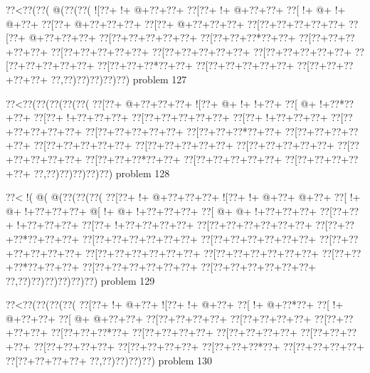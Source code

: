 \vbox{\vbox{\goo
\0??<\0??(\0??(\- @(\0??(\0??(
\- ![\0??+\- !+\- @+\0??+\0??+
\0??[\0??+\- !+\- @+\0??+\0??+
\0??[\- !+\- @+\- !+\- @+\0??+
\0??[\0??+\- @+\0??+\0??+\0??+
\0??[\0??+\- @+\0??+\0??+\0??+
\0??[\0??+\0??+\0??+\0??+\0??+
\0??[\0??+\- @+\0??+\0??+\0??+
\0??[\0??+\0??+\0??+\0??+\0??+
\0??[\0??+\0??+\0??*\0??+\0??+
\0??[\0??+\0??+\0??+\0??+\0??+
\0??[\0??+\0??+\0??+\0??+\0??+
\0??[\0??+\0??+\0??+\0??+\0??+
\0??[\0??+\0??+\0??+\0??+\0??+
\0??[\0??+\0??+\0??+\0??+\0??+
\0??[\0??+\0??+\0??*\0??+\0??+
\0??[\0??+\0??+\0??+\0??+\0??+
\0??[\0??+\0??+\0??+\0??+\0??+
\0??,\0??)\0??)\0??)\0??)\0??)
}
\hfil problem 127\hfil\break
}

\vbox{\vbox{\goo
\0??<\0??(\0??(\0??(\0??(\0??(
\0??[\0??+\- @+\0??+\0??+\0??+
\- ![\0??+\- @+\- !+\- !+\0??+
\0??[\- @+\- !+\0??*\0??+\0??+
\0??[\0??+\- !+\0??+\0??+\0??+
\0??[\0??+\0??+\0??+\0??+\0??+
\0??[\0??+\- !+\0??+\0??+\0??+
\0??[\0??+\0??+\0??+\0??+\0??+
\0??[\0??+\0??+\0??+\0??+\0??+
\0??[\0??+\0??+\0??*\0??+\0??+
\0??[\0??+\0??+\0??+\0??+\0??+
\0??[\0??+\0??+\0??+\0??+\0??+
\0??[\0??+\0??+\0??+\0??+\0??+
\0??[\0??+\0??+\0??+\0??+\0??+
\0??[\0??+\0??+\0??+\0??+\0??+
\0??[\0??+\0??+\0??*\0??+\0??+
\0??[\0??+\0??+\0??+\0??+\0??+
\0??[\0??+\0??+\0??+\0??+\0??+
\0??,\0??)\0??)\0??)\0??)\0??)
}
\hfil problem 128\hfil\break
}

\vbox{\vbox{\goo
\0??<\- !(\- @(\- @(\0??(\0??(\0??(
\0??[\0??+\- !+\- @+\0??+\0??+\0??+
\- ![\0??+\- !+\- @+\0??+\- @+\0??+
\0??[\- !+\- @+\- !+\0??+\0??+\0??+
\- @[\- !+\- @+\- !+\0??+\0??+\0??+
\0??[\- @+\- @+\- !+\0??+\0??+\0??+
\0??[\0??+\0??+\- !+\0??+\0??+\0??+
\0??[\0??+\- !+\0??+\0??+\0??+\0??+
\0??[\0??+\0??+\0??+\0??+\0??+\0??+
\0??[\0??+\0??+\0??*\0??+\0??+\0??+
\0??[\0??+\0??+\0??+\0??+\0??+\0??+
\0??[\0??+\0??+\0??+\0??+\0??+\0??+
\0??[\0??+\0??+\0??+\0??+\0??+\0??+
\0??[\0??+\0??+\0??+\0??+\0??+\0??+
\0??[\0??+\0??+\0??+\0??+\0??+\0??+
\0??[\0??+\0??+\0??*\0??+\0??+\0??+
\0??[\0??+\0??+\0??+\0??+\0??+\0??+
\0??[\0??+\0??+\0??+\0??+\0??+\0??+
\0??,\0??)\0??)\0??)\0??)\0??)\0??)
}
\hfil problem 129\hfil\break
}

\vbox{\vbox{\goo
\0??<\0??(\0??(\0??(\0??(
\0??[\0??+\- !+\- @+\0??+
\- ![\0??+\- !+\- @+\0??+
\0??[\- !+\- @+\0??*\0??+
\0??[\- !+\- @+\0??+\0??+
\0??[\- @+\- @+\0??+\0??+
\0??[\0??+\0??+\0??+\0??+
\0??[\0??+\0??+\0??+\0??+
\0??[\0??+\0??+\0??+\0??+
\0??[\0??+\0??+\0??*\0??+
\0??[\0??+\0??+\0??+\0??+
\0??[\0??+\0??+\0??+\0??+
\0??[\0??+\0??+\0??+\0??+
\0??[\0??+\0??+\0??+\0??+
\0??[\0??+\0??+\0??+\0??+
\0??[\0??+\0??+\0??*\0??+
\0??[\0??+\0??+\0??+\0??+
\0??[\0??+\0??+\0??+\0??+
\0??,\0??)\0??)\0??)\0??)
}
\hfil problem 130\hfil\break
}

